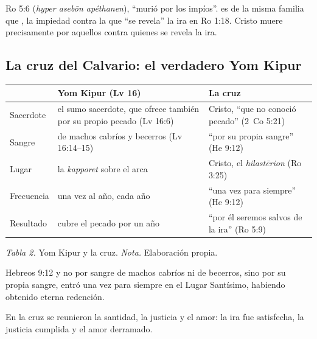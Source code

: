 \begin{filologiatexto}{Ro 5:6}
 (\emph{hyper asebōn apéthanen}), ``murió por los impíos''.  es de la misma familia que , la impiedad contra la que ``se revela'' la ira en Ro 1:18. Cristo muere precisamente por aquellos contra quienes se revela la ira.
\end{filologiatexto}


\subsection{La cruz del Calvario: el verdadero Yom Kipur}
\begin{center}\small\renewcommand{\arraystretch}{1.3}
\begin{tabular}{@{}L{2.6cm}L{5.6cm}L{6.2cm}@{}}
\toprule
& \textbf{Yom Kipur (Lv 16)} & \textbf{La cruz} \\ \midrule
Sacerdote & el sumo sacerdote, que ofrece también por su propio pecado (Lv 16:6) & Cristo, ``que no conoció pecado'' (2~Co 5:21) \\
Sangre & de machos cabríos y becerros (Lv 16:14--15) & ``por su propia sangre'' (He 9:12) \\
Lugar & la \emph{kapporet} sobre el arca & Cristo, el \emph{hilastērion} (Ro 3:25) \\
Frecuencia & una vez al año, cada año & ``una vez para siempre'' (He 9:12) \\
Resultado & cubre el pecado por un año & ``por él seremos salvos de la ira'' (Ro 5:9) \\
\bottomrule
\end{tabular}\par\smallskip
{\footnotesize\color{gris}\textit{Tabla 2.} Yom Kipur y la cruz. \textit{Nota.} Elaboración propia.}
\end{center}

\begin{verso}{Hebreos 9:12}
y no por sangre de machos cabríos ni de becerros, sino por su propia sangre, entró una vez para siempre en el Lugar Santísimo, habiendo obtenido eterna redención.
\end{verso}

\begin{tcolorbox}[colback=papiro,colframe=dorado,boxrule=1.2pt,arc=3pt]
\centering En la cruz se reunieron la santidad, la justicia y el amor: la ira fue satisfecha, la justicia cumplida y el amor derramado.
\end{tcolorbox}


